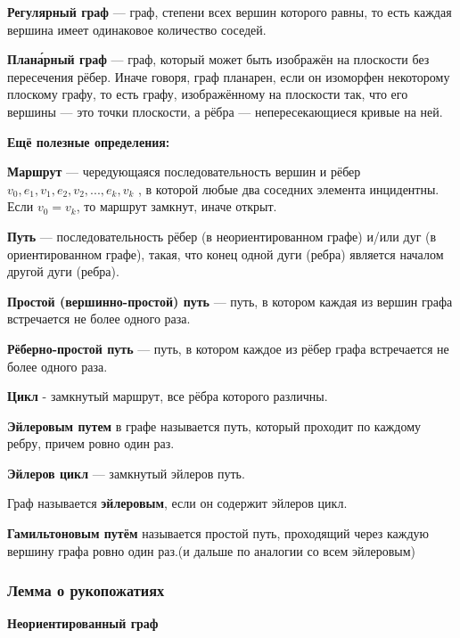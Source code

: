 \documentclass[12pt]{matmex-diploma}
\begin{document}
            \textbf{Регулярный граф} — граф, степени всех вершин которого равны, то есть каждая вершина имеет одинаковое количество соседей.
            
            \textbf{Плана́рный граф} — граф, который может быть изображён на плоскости без пересечения рёбер. Иначе говоря, граф планарен, если он изоморфен некоторому плоскому графу, то есть графу, изображённому на плоскости так, что его вершины — это точки плоскости, а рёбра — непересекающиеся кривые на ней.
          
            \textbf{Ещё полезные определения:}
            
            \textbf{Маршрут }— чередующаяся последовательность вершин и рёбер $v_0, e_1, v_1, e_2, v_2,...,e_k,v_k$ , в которой любые два соседних элемента инцидентны. Если $v_0 = v_k$, то маршрут замкнут, иначе открыт.
            
            \textbf{Путь} — последовательность рёбер (в неориентированном графе) и/или дуг (в ориентированном графе), такая, что конец одной дуги (ребра) является началом другой дуги (ребра).
            
            \textbf{Простой (вершинно-простой) путь} — путь, в котором каждая из вершин графа встречается не более одного раза.
            
            \textbf{Рёберно-простой путь} — путь, в котором каждое из рёбер графа встречается не более одного раза.
            
            \textbf{Цикл} - замкнутый маршрут, все рёбра которого различны.
            
            \textbf{Эйлеровым путем} в графе называется путь, который проходит по каждому ребру, причем ровно один раз.
            
            \textbf{Эйлеров цикл} — замкнутый эйлеров путь.
            
            Граф называется \textbf{эйлеровым}, если он содержит эйлеров цикл.
            
            \textbf{Гамильтоновым путём} называется простой путь, проходящий через каждую вершину графа ровно один раз.(и дальше по аналогии со всем эйлеровым)
            
        \subsubsection*{Лемма о рукопожатиях}
        
            \textbf{Неориентированный граф}
            
\end{document}
